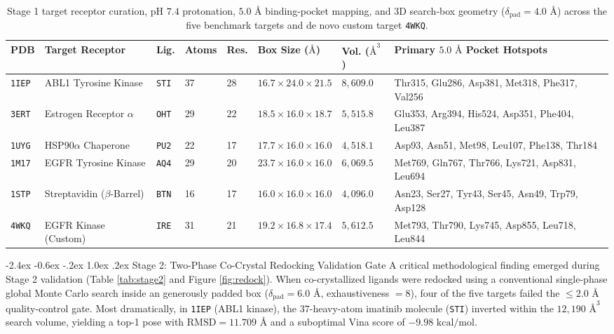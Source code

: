 \documentclass[11pt,a4paper]{article}
\makeatletter
\renewcommand{\subsection}{\@startsection{subsection}{2}{\z@}%
  {-2.4ex \@plus -0.6ex \@minus -.2ex}%
  {1.0ex \@plus .2ex}%
  {\normalfont\large\bfseries\color{primary}}}
\makeatother
\begin{document}
\begin{table}[!htbp]
\centering
\caption{Stage 1 target receptor curation, $\text{pH }7.4$ protonation, $5.0\text{ \AA}$ binding-pocket mapping, and 3D search-box geometry ($\delta_{\text{pad}} = 4.0\text{ \AA}$) across the five benchmark targets and de novo custom target \texttt{4WKQ}.}
\label{tab:stage1}
\vspace{2pt}
{\footnotesize
\renewcommand{\arraystretch}{1.22}
\begin{tabularx}{\textwidth}{L{0.85cm} L{2.4cm} C{0.75cm} C{0.85cm} C{0.75cm} C{2.35cm} R{1.2cm} Y}
\toprule
{}
\textbf{PDB} & \textbf{Target Receptor} & \textbf{Lig.} & \textbf{Atoms} & \textbf{Res.} & \textbf{Box Size ($\text{\AA}$)} & \textbf{Vol. ($\text{\AA}^3$)} & \textbf{Primary $5.0\text{ \AA}$ Pocket Hotspots} \\
\midrule
\texttt{1IEP} & ABL1 Tyrosine Kinase & \texttt{STI} & 37 & 28 & $16.7 \times 24.0 \times 21.5$ & $8,609.0$ & Thr315, Glu286, Asp381, Met318, Phe317, Val256 \\
\texttt{3ERT} & Estrogen Receptor $\alpha$ & \texttt{OHT} & 29 & 22 & $18.5 \times 16.0 \times 18.7$ & $5,515.8$ & Glu353, Arg394, His524, Asp351, Phe404, Leu387 \\
\texttt{1UYG} & HSP90$\alpha$ Chaperone & \texttt{PU2} & 22 & 17 & $17.7 \times 16.0 \times 16.0$ & $4,518.1$ & Asp93, Asn51, Met98, Leu107, Phe138, Thr184 \\
\texttt{1M17} & EGFR Tyrosine Kinase & \texttt{AQ4} & 29 & 20 & $23.7 \times 16.0 \times 16.0$ & $6,069.5$ & Met769, Gln767, Thr766, Lys721, Asp831, Leu694 \\
\texttt{1STP} & Streptavidin ($\beta$-Barrel) & \texttt{BTN} & 16 & 17 & $16.0 \times 16.0 \times 16.0$ & $4,096.0$ & Asn23, Ser27, Tyr43, Ser45, Asn49, Trp79, Asp128 \\
\texttt{4WKQ} & EGFR Kinase (Custom) & \texttt{IRE} & 31 & 21 & $19.2 \times 16.8 \times 17.4$ & $5,612.5$ & Met793, Thr790, Lys745, Asp855, Leu718, Leu844 \\
\bottomrule
\end{tabularx}
}
\end{table}

\subsection{Stage 2: Two-Phase Co-Crystal Redocking Validation Gate}
\noindent A critical methodological finding emerged during Stage 2 validation (Table \ref{tab:stage2} and Figure \ref{fig:redock}). When co-crystallized ligands were redocked using a conventional single-phase global Monte Carlo search inside an generously padded box ($\delta_{\text{pad}} = 6.0\text{ \AA}$, exhaustiveness $= 8$), four of the five targets failed the $\le 2.0\text{ \AA}$ quality-control gate. Most dramatically, in \texttt{1IEP} (ABL1 kinase), the $37$-heavy-atom imatinib molecule (\texttt{STI}) inverted within the $12,190\text{ \AA}^3$ search volume, yielding a top-1 pose with $\text{RMSD} = 11.709\text{ \AA}$ and a suboptimal Vina score of $-9.98\text{ kcal/mol}$.
\end{document}
